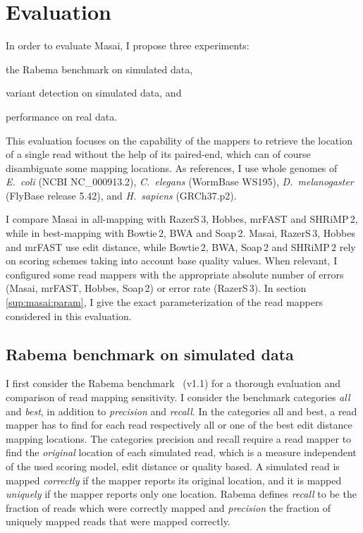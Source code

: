 
\section{Evaluation}
\label{masai:evaluation}

In order to evaluate Masai, I propose three experiments:
\begin{inparaenum}[(i)]
\item the Rabema benchmark on simulated data,
\item variant detection on simulated data, and 
\item performance on real data.
\end{inparaenum}
This evaluation focuses on the capability of the mappers to retrieve the location of a single read without the help of its paired-end, which can of course disambiguate some mapping locations.
As references, I use whole genomes of \emph{E.~coli} (NCBI NC\_000913.2), \emph{C.~elegans} (WormBase WS195), \emph{D.~melanogaster} (FlyBase release 5.42), and \emph{H.~sapiens} (GRCh37.p2).

I compare Masai in all-mapping with RazerS\,3, Hobbes, mrFAST and SHRiMP\,2, while in best-mapping with Bowtie\,2, BWA and Soap\,2.
Masai, RazerS\,3, Hobbes and mrFAST use edit distance, while Bowtie\,2, BWA, Soap\,2 and SHRiMP\,2 rely on scoring schemes taking into account base quality values.
When relevant, I configured some read mappers with the appropriate absolute number of errors (Masai, mrFAST, Hobbes, Soap\,2) or error rate (RazerS\,3).
In section \ref{sup:masai:param}, I give the exact parameterization of the read mappers considered in this evaluation.

\subsection{Rabema benchmark on simulated data}
\label{masai:evaluation:rabema}

I first consider the Rabema benchmark~\citep{Holtgrewe2011} (v1.1) for a thorough evaluation and comparison of read mapping sensitivity.
I consider the benchmark categories \emph{all} and \emph{best}, in addition to \emph{precision} and \emph{recall}.
In the categories all and best, a read mapper has to find for each read respectively all or one of the best edit distance mapping locations.
The categories precision and recall require a read mapper to find the \emph{original} location of each simulated read, which is a measure independent of the used scoring model, \eg edit distance or quality based.
A simulated read is mapped \emph{correctly} if the mapper reports its original location, 
and it is mapped \emph{uniquely} if the mapper reports only one location.
Rabema defines \emph{recall} to be the fraction of reads which were correctly mapped and \emph{precision} the fraction of uniquely mapped reads that were mapped correctly.

